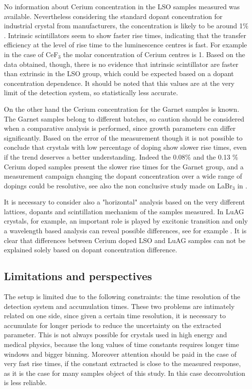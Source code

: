 No information about Cerium concentration in the LSO samples measured was available. Nevertheless considering the standard dopant concentration for industrial crystal from manufacturers, the concentration is likely to be around 1$\%$. 
Intrinsic scintillators seem to show faster rise times, indicating that the transfer efficiency at the level of rise time to the luminescence centres is fast. For example in the case of CeF$_{3}$ the molar concentration of Cerium centres is 1. Based on the data obtained, though, there is no evidence that intrinsic scintillator are faster than extrinsic in the LSO group, which could be expected based on a dopant concentration dependence. It should be noted that this values are at the very limit of the detection system, so statistically less accurate.

On the other hand the Cerium concentration for the Garnet samples is known. 
The Garnet samples belong to different batches, so caution should be considered when a comparative analysis is performed, since growth parameters can differ significantly. Based on the error of the measurement though it is not possible to conclude that crystals with low percentage of doping show slower rise times, even if the trend deserves a better understanding. Indeed the 0.08$\%$ and the 0.13 $\%$ Cerium doped samples present the slower rise times for the Garnet group, and a measurement campaign changing the dopant concentration over a wide range of dopings could be resolutive, see also the non conclusive study made on LaBr$_{3}$ in \cite{Moses2004}.

It is necessary to consider also a "horizontal" analysis based on the very different lattices, dopants and scintillation mechanism of the samples measured. In LuAG crystals, for example, an important role is played by excitonic transition and only a wavelength based analysis can reveal possible differences, see for example \cite{Belsky2013}.
It is clear that differences between Cerium doped LSO and LuAG samples can not be explained solely based on dopant concentration difference.

\subsection{Limitations and perspectives}

The setup is limited due to the following constraints: the time resolution of the detection system and accumulation times. 
These two problems are intimately related on one side, since given a certain time resolution, it is necessary to accumulate for longer periods to reduce the uncertainty on the extracted parameter. This is not always possible for crystals used in high energy and medical physics, because the long values of time constants requires longer time windows and bigger binning.
Moreover attention should be paid in the case of very fast rise times, if the constant extracted is close to the measured response, as it is the case for many samples object of this study. In this case deconvolution is less reliable.


